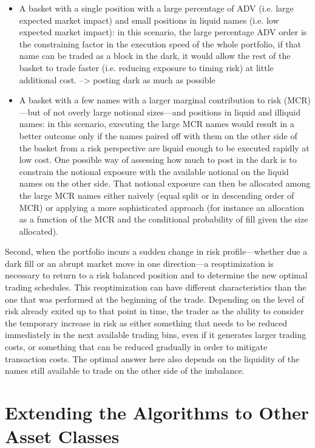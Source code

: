 \begin{itemize}
\item A basket with a single position with a large percentage of ADV (i.e. large expected market impact) and small positions in liquid names (i.e. low expected market impact): in this scenario, the large percentage ADV order is the constraining factor in the execution speed of the whole portfolio, if that name can be traded as a block in the dark, it would allow the rest of the basket to trade faster (i.e. reducing exposure to timing risk) at little additional cost. --> posting dark as much as possible
\item A basket with a few names with a larger marginal contribution to risk (MCR)---but of not overly large notional sizes---and positions in liquid and illiquid names: in this scenario, executing the large MCR names would result in a better outcome only if the names paired off with them on the other side of the basket from a risk perspective are liquid enough to be executed rapidly at low cost. One possible way of assessing how much to post in the dark is to constrain the notional exposure with the available notional on the liquid names on the other side. That notional exposure can then be allocated among the large MCR names either naively (equal split or in descending order of MCR) or applying a more sophisticated approach (for instance an allocation as a function of the MCR and the conditional probability of fill given the size allocated).
\end{itemize}


Second, when the portfolio incurs a sudden change in risk profile---whether due a dark fill or an abrupt market move in one direction---a reoptimization is necessary to return to a risk balanced position and to determine the new optimal trading schedules. This reoptimization can have different characteristics than the one that was performed at the beginning of the trade. Depending on the level of risk already exited up to that point in time, the trader as the ability to consider the temporary increase in risk as either something that needs to be reduced immediately in the next available trading bins, even if it generates larger trading costs, or something that can be reduced gradually in order to mitigate transaction costs. The optimal answer here also depends on the liquidity of the names still available to trade on the other side of the imbalance.



\section{Extending the Algorithms to Other Asset Classes}

